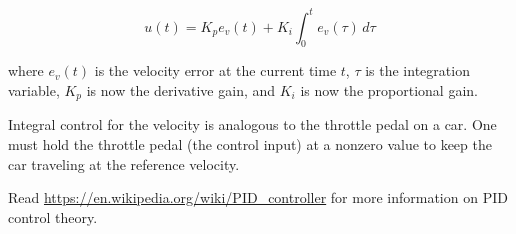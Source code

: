 \begin{theorem}
  \label{thm:vel_pid}

  \begin{equation}
    u(t) = K_p e_v(t) + K_i \int_0^t e_v(\tau) \,d\tau
  \end{equation}

  where $e_v(t)$ is the velocity error at the current time $t$, $\tau$ is the
  integration variable, $K_p$ is now the derivative gain, and $K_i$ is now the
  proportional gain.
\end{theorem}

Integral control for the velocity is analogous to the throttle pedal on a car.
One must hold the throttle pedal (the control input) at a nonzero value to keep
the car traveling at the reference velocity.

Read \url{https://en.wikipedia.org/wiki/PID_controller} for more information on
PID control theory.
